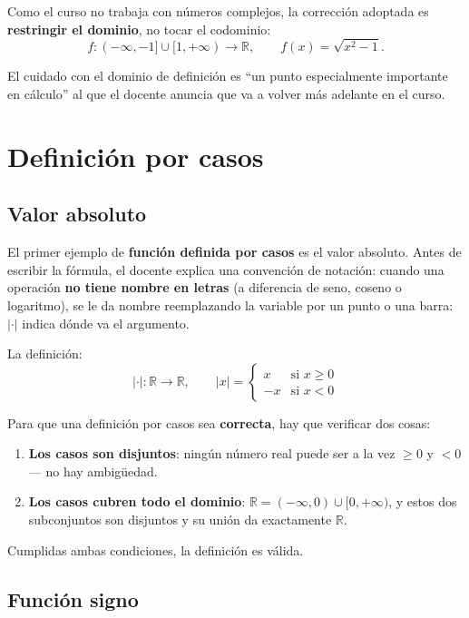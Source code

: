 \documentclass[12pt,a4paper]{article}
\begin{document}
Como el curso no trabaja con números complejos, la corrección adoptada es \textbf{restringir el dominio}, no tocar el codominio:
$$f : (-\infty,-1] \cup [1,+\infty) \to \mathbb{R}, \qquad f(x) = \sqrt{x^2-1}.$$

\begin{warnbox}
El cuidado con el dominio de definición es ``un punto especialmente importante en cálculo'' al que el docente anuncia que va a volver más adelante en el curso.
\end{warnbox}

\section{Definición por casos}

\subsection{Valor absoluto}

El primer ejemplo de \textbf{función definida por casos} es el valor absoluto. Antes de escribir la fórmula, el docente explica una convención de notación: cuando una operación \textbf{no tiene nombre en letras} (a diferencia de seno, coseno o logaritmo), se le da nombre reemplazando la variable por un punto o una barra: $|\cdot|$ indica dónde va el argumento.

La definición:
$$|\cdot| : \mathbb{R} \to \mathbb{R}, \qquad |x| = \begin{cases} x & \text{si } x \geq 0 \\ -x & \text{si } x < 0 \end{cases}$$

Para que una definición por casos sea \textbf{correcta}, hay que verificar dos cosas:

\begin{enumerate}
  \item \textbf{Los casos son disjuntos}: ningún número real puede ser a la vez $\geq 0$ y $< 0$ --- no hay ambigüedad.
  \item \textbf{Los casos cubren todo el dominio}: $\mathbb{R} = (-\infty, 0) \cup [0, +\infty)$, y estos dos subconjuntos son disjuntos y su unión da exactamente $\mathbb{R}$.
\end{enumerate}

Cumplidas ambas condiciones, la definición es válida.

\subsection{Función signo}
\end{document}
